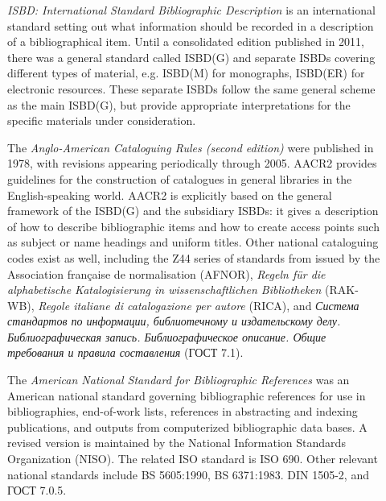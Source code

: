 \begin{description}
\item[{\hyperlink{ISBD}{}}]\textit{ISBD: International Standard Bibliographic Description} is an international standard setting out what information should be recorded in a description of a bibliographical item. Until a consolidated edition published in 2011, there was a general standard called ISBD(G) and separate ISBDs covering different types of material, e.g. ISBD(M) for monographs, ISBD(ER) for electronic resources. These separate ISBDs follow the same general scheme as the main ISBD(G), but provide appropriate interpretations for the specific materials under consideration.
\item[{\hyperlink{HD-BIBL-1}{}}]The \textit{Anglo-American Cataloguing Rules (second edition)} were published in 1978, with revisions appearing periodically through 2005. AACR2 provides guidelines for the construction of catalogues in general libraries in the English-speaking world. AACR2 is explicitly based on the general framework of the ISBD(G) and the subsidiary ISBDs: it gives a description of how to describe bibliographic items and how to create access points such as subject or name headings and uniform titles. Other national cataloguing codes exist as well, including the Z44 series of standards from issued by the Association française de normalisation (AFNOR), \textit{Regeln für die alphabetische Katalogisierung in wissenschaftlichen Bibliotheken} (RAK-WB), \textit{Regole italiane di catalogazione per autore} (RICA), and \textit{Система стандартов по информации, библиотечному и издательскому делу. Библиографическая запись. Библиографическое описание. Общие требования и правила составления} (ГОСТ 7.1).
\item[{\hyperlink{COBICOR-eg-246}{}}]The \textit{American National Standard for Bibliographic References} was an American national standard governing bibliographic references for use in bibliographies, end-of-work lists, references in abstracting and indexing publications, and outputs from computerized bibliographic data bases. A revised version is maintained by the National Information Standards Organization (NISO). The related ISO standard is ISO 690. Other relevant national standards include BS 5605:1990, BS 6371:1983. DIN 1505-2, and ГОСТ 7.0.5.
\end{description} \par
